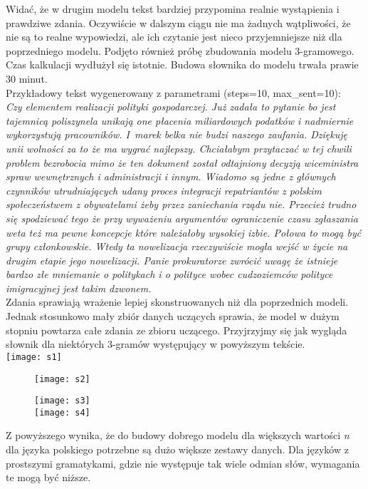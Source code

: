 \documentclass[a4paper,11pt,twoside]{report}
\theoremstyle{definition}
\begin{document}
Widać, że w drugim modelu tekst bardziej przypomina realnie wystąpienia i prawdziwe zdania. Oczywiście w dalszym ciągu nie ma żadnych wątpliwości, że nie są to realne wypowiedzi, ale ich czytanie jest nieco przyjemniejsze niż dla poprzedniego modelu.
Podjęto również próbę zbudowania modelu 3-gramowego. Czas kalkulacji wydłużył się istotnie. Budowa słownika do modelu trwała prawie 30 minut.\\
Przykładowy tekst wygenerowany z parametrami (steps=10, max\_sent=10):\\ \textit{Czy elementem realizacji polityki gospodarczej. Już zadała to pytanie bo jest tajemnicą poliszynela unikają one płacenia miliardowych podatków i nadmiernie wykorzystują pracowników. I~marek belka nie budzi naszego zaufania. Dziękuję unii wolności za to że ma wygrać najlepszy. Chciałabym przytaczać w tej chwili problem bezrobocia mimo że ten dokument został odtajniony decyzją wiceministra spraw wewnętrznych i administracji i innym. Wiadomo są jedne z głównych czynników utrudniających udany proces integracji repatriantów z polskim społeczeństwem z obywatelami żeby przez zaniechania rządu nie. Przecież trudno się spodziewać tego że przy wyważeniu argumentów ograniczenie czasu zgłaszania weta też ma pewne koncepcje które należałoby wysokiej izbie. Połowa to mogą być grupy członkowskie. Wtedy ta nowelizacja rzeczywiście mogła wejść w życie na drugim etapie jego nowelizacji. Panie prokuratorze zwrócić uwagę że istnieje bardzo złe mniemanie o politykach i o polityce wobec cudzoziemców polityce imigracyjnej jest takim dzwonem.}\\

Zdania sprawiają wrażenie lepiej skonstruowanych niż dla poprzednich modeli. Jednak stosunkowo mały zbiór danych uczących sprawia, że model w dużym stopniu powtarza całe zdania ze zbioru uczącego.
Przyjrzyjmy się jak wygląda słownik dla niektórych 3-gramów występujący w powyższym tekście. \\

\texttt{[image: s1]}

\begin{figure}
\texttt{[image: s2]}
\end{figure}
\begin{figure}
\texttt{[image: s3]}\\
\texttt{[image: s4]}
\end{figure}


Z powyższego wynika, że do budowy dobrego modelu dla większych wartości \textit{n} dla języka polskiego potrzebne są dużo większe zestawy danych. Dla języków z prostszymi gramatykami, gdzie nie występuje tak wiele odmian słów, wymagania te mogą być niższe.
\end{document}
